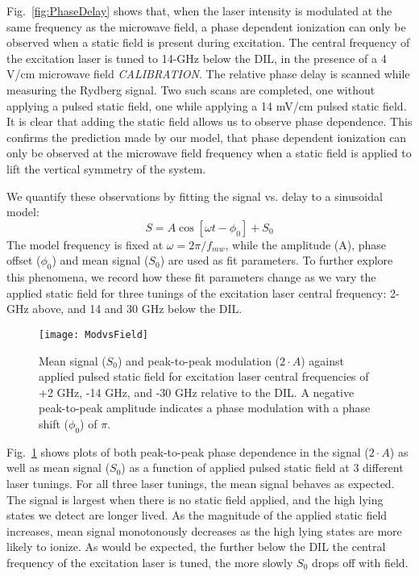 \documentclass[aps,pra,preprint,groupedaddress]{revtex4-1}
\begin{document}
Fig.~\ref{fig:PhaseDelay} shows that, when the laser intensity is modulated at the same frequency as the microwave field, a phase dependent ionization can only be observed when a static field is present during excitation. The central frequency of the excitation laser is tuned to 14-GHz below the DIL, in the presence of a 4 V/cm microwave field \emph{CALIBRATION}. The relative phase delay is scanned while measuring the Rydberg signal. Two such scans are completed, one without applying a pulsed static field, one while applying a 14 mV/cm pulsed static field. It is clear that adding the static field allows us to observe phase dependence. This confirms the prediction made by our model, that phase dependent ionization can only be observed at the microwave field frequency when a static field is applied to lift the vertical symmetry of the system.

We quantify these observations by fitting the signal vs. delay to a sinusoidal model:
\begin{equation}
S = A \cos{[\omega t - \phi_0]} + S_0
\end{equation}
The model frequency is fixed at $\omega = 2\pi / f_{mw}$, while the amplitude (A), phase offset ($\phi_0$) and mean signal ($S_0$) are used as fit parameters. To further explore this phenomena, we record how these fit parameters change as we vary the applied static field for three tunings of the excitation laser central frequency: 2-GHz above, and 14 and 30 GHz below the DIL.

\begin{figure}
	\texttt{[image: ModvsField]}
	\caption{Mean signal ($S_0$) and peak-to-peak modulation ($2\cdot A$) against applied pulsed static field for excitation laser central frequencies of +2 GHz, -14 GHz, and -30 GHz relative to the DIL. A negative peak-to-peak amplitude indicates a phase modulation with a phase shift ($\phi_0$) of $\pi$.}
	\label{fig:ModvsField}
	\end{figure}

Fig.~\ref{fig:ModvsField} shows plots of both peak-to-peak phase dependence in the signal ($2\cdot A$) as well as mean signal ($S_0$) as a function of applied pulsed static field at 3 different laser tunings. For all three laser tunings, the mean signal behaves as expected. The signal is largest when there is no static field applied, and the high lying states we detect are longer lived. As the magnitude of the applied static field increases, mean signal monotonously decreases as the high lying states are more likely to ionize. As would be expected, the further below the DIL the central frequency of the excitation laser is tuned, the more slowly $S_0$ drops off with field.
\end{document}
